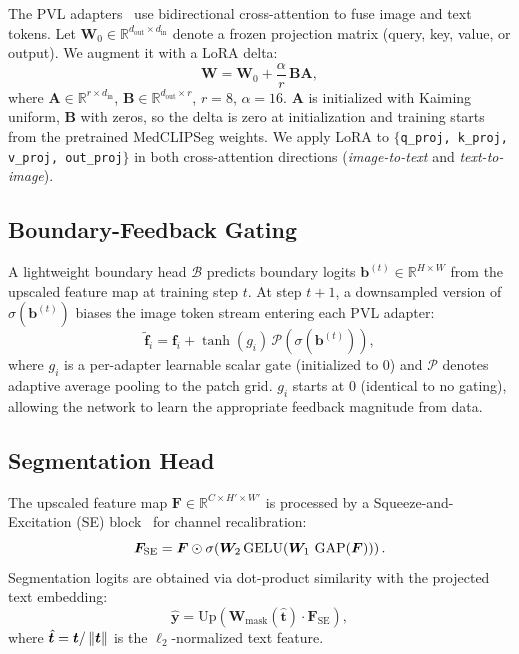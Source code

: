 The PVL adapters~\cite{} use bidirectional cross-attention to fuse image and
text tokens. Let $\bm{W}_0 \in \mathbb{R}^{d_\text{out} \times d_\text{in}}$
denote a frozen projection matrix (query, key, value, or output). We augment it
with a LoRA delta:
\begin{equation}
    \bm{W} = \bm{W}_0 + \frac{\alpha}{r}\,\bm{B}\bm{A},
\end{equation}
where $\bm{A} \in \mathbb{R}^{r \times d_\text{in}}$,
$\bm{B} \in \mathbb{R}^{d_\text{out} \times r}$, $r{=}8$, $\alpha{=}16$.
$\bm{A}$ is initialized with Kaiming uniform, $\bm{B}$ with zeros, so the delta
is zero at initialization and training starts from the pretrained MedCLIPSeg
weights. We apply LoRA to $\{$\texttt{q\_proj, k\_proj, v\_proj, out\_proj}$\}$
in both cross-attention directions (\emph{image-to-text} and \emph{text-to-image}).

\subsection{Boundary-Feedback Gating}
\label{subsec:boundary}

A lightweight boundary head $\mathcal{B}$ predicts boundary logits
$\bm{b}^{(t)} \in \mathbb{R}^{H \times W}$ from the upscaled feature map at
training step $t$. At step $t{+}1$, a downsampled version of $\sigma(\bm{b}^{(t)})$
biases the image token stream entering each PVL adapter:
\begin{equation}
    \tilde{\bm{f}}_i = \bm{f}_i + \tanh(g_i)\,
        \mathcal{P}(\sigma(\bm{b}^{(t)})),
\end{equation}
where $g_i$ is a per-adapter learnable scalar gate (initialized to 0) and
$\mathcal{P}$ denotes adaptive average pooling to the patch grid. $g_i$ starts
at 0 (identical to no gating), allowing the network to learn the appropriate
feedback magnitude from data.

\subsection{Segmentation Head}
\label{subsec:seghead}

The upscaled feature map $\bm{F} \in \mathbb{R}^{C \times H' \times W'}$ is
processed by a Squeeze-and-Excitation (SE) block~\cite{hu2018senet} for
channel recalibration:
\begin{equation}
    \bm{F}_\text{SE} = \bm{F} \odot \sigma\!\left(
        \bm{W}_2 \,\text{GELU}\!\left(\bm{W}_1\,\operatorname{GAP}(\bm{F})\right)\right).
\end{equation}
Segmentation logits are obtained via dot-product similarity with the projected
text embedding:
\begin{equation}
    \hat{\bm{y}} = \text{Up}\!\left(
        \bm{W}_\text{mask}(\hat{\bm{t}})\cdot\bm{F}_\text{SE}\right),
\end{equation}
where $\hat{\bm{t}} = \bm{t}/\left\lVert\bm{t}\right\rVert$ is the $\ell_2$-normalized text
feature.

